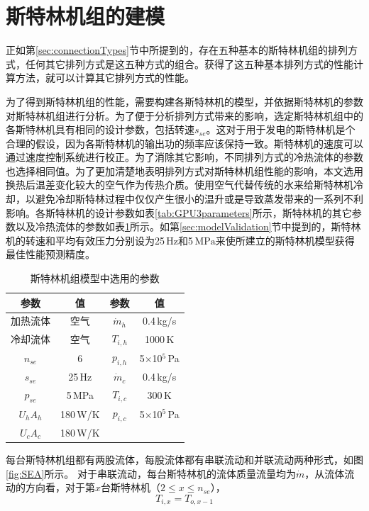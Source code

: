 \section{斯特林机组的建模}

正如第\ref{sec:connectionTypes}节中所提到的，存在五种基本的斯特林机组的排列方式，任何其它排列方式是这五种方式的组合。获得了这五种基本排列方式的性能计算方法，就可以计算其它排列方式的性能。

为了得到斯特林机组的性能，需要构建各斯特林机的模型，并依据斯特林机的参数对斯特林机组进行分析。为了便于分析排列方式带来的影响，选定斯特林机组中的各斯特林机具有相同的设计参数，包括转速$s_{se}$。这对于用于发电的斯特林机是个合理的假设，因为各斯特林机的输出功的频率应该保持一致。斯特林机的速度可以通过速度控制系统进行校正\cite{Hooshang2016}。为了消除其它影响，不同排列方式的冷热流体的参数也选择相同值。为了更加清楚地表明排列方式对斯特林机组性能的影响，本文选用换热后温差变化较大的空气作为传热介质。使用空气代替传统的水来给斯特林机冷却，以避免冷却斯特林过程中仅仅产生很小的温升或是导致蒸发带来的一系列不利影响。各斯特林机的设计参数如表\ref{tab:GPU3parameters}所示，斯特林机的其它参数以及冷热流体的参数如表\ref{tab:parameters}所示。如第\ref{sec:modelValidation}节中提到的，斯特林机的转速和平均有效压力分别设为25$\,\mathrm{Hz}$和5$\,\mathrm{MPa}$来使所建立的斯特林机模型获得最佳性能预测精度。

\begin{table}[htbp]
\setlength{\abovecaptionskip}{-10pt}
	\caption{斯特林机组模型中选用的参数}
	\begin{center}
	\begin{tabular}{cccc}
		\toprule
		参数		&	值	& 参数	&	值\\
		\midrule
		加热流体	&	空气		&	$\dot{m}_h$	&	0.4\,kg/s\\
		冷却流体	&	空气	&	$T_{i,h}$	&	1000\,K\\
		$n_{se}$	&	6	&	$p_{i,h}$	&	5$\times$10$^5$\,Pa\\
		$s_{se}$	&	25\,Hz	&	$\dot{m}_c$	&	0.4\,kg/s\\
		$p_{se}$		&	5\,MPa	&	$T_{i,c}$	&	300\,K\\
		$U_hA_h$	&	180\,W/K	&	$p_{i,c}$	&	5$\times$10$^5$\,Pa\\
		$U_cA_c$		&	180\,W/K	&&\\
		\bottomrule
	\end{tabular}
	\end{center}
	\label{tab:parameters}
\end{table}

每台斯特林机组都有两股流体，每股流体都有串联流动和并联流动两种形式，如图\ref{fig:SEA}所示。
对于串联流动，每台斯特林机的流体质量流量均为$\dot{m}$，从流体流动的方向看，对于第$x$台斯特林机（$2\leqslant{}x\leqslant{}n_{se}$），
\begin{equation}
	T_{i,x} = T_{o,x-1}
	\label{eq:T_serial}
\end{equation}

